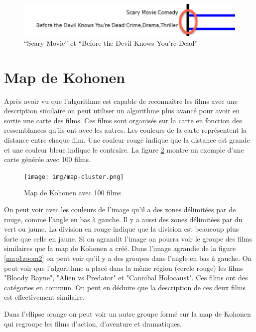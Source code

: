 \begin{figure}[h]
  \centering
    \includegraphics[width=0.5\linewidth]{img/scarymovie.png}
  \caption{``Scary Movie'' et ``Before the Devil Knows You're Dead''}
  \label{scarymovie}
\end{figure}



\section{Map de Kohonen}

Après avoir vu que l'algorithme est capable de reconnaître les films avec une description similaire on peut utiliser un algorithme plus avancé pour avoir en sortie une carte des films. Ces films sont organisés sur la carte en fonction des ressemblances qu'ils ont avec les autres. Les couleurs de la carte représentent la distance entre chaque film. Une couleur rouge indique que la distance est grande et une couleur bleue indique le contraire. La figure \ref{map1} montre un exemple d'une carte générée avec 100 films.

\begin{figure}[h]
  \centering
  \texttt{[image: img/map-cluster.png]}
  \caption{Map de Kohonen avec 100 films}
  \label{map1}
\end{figure}

On peut voir avec les couleurs de l'image qu'il a des zones délimitées par de rouge, comme l'angle en bas à gauche. Il y a aussi des zones délimitées par du vert ou jaune. La division en rouge indique que la division est beaucoup plus forte que celle en jaune. Si on agrandit l'image on pourra voir le groupe des films similaires que la map de Kohonen a créé.
Dans l'image agrandie de la figure \ref{map1zoom2} on peut voir qu'il y a des groupes dans l'angle en bas à gauche. On peut voir que l'algorithme a placé dans la même région (cercle rouge) les films "Bloody Rayne", "Alien vs Predator" et "Cannibal Holocaust". Ces films ont des catégories en commun. On peut en déduire que la description de ces deux films est effectivement similaire.

Dans l'ellipse orange on peut voir un autre groupe formé sur la map de Kohonen qui regroupe les films d'action, d'aventure et dramatiques.

